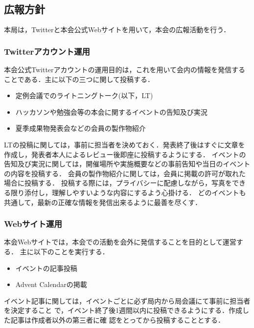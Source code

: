 \subsection*{広報方針}

本局は，Twitterと本会公式Webサイトを用いて，本会の広報活動を行う．

\subsubsection*{Twitterアカウント運用}
本会公式Twitterアカウントの運用目的は，これを用いて会内の情報を発信することである．主に以下の三つに関して投稿する．
\begin{itemize}
    \item 定例会議でのライトニングトーク(以下，LT)
    \item ハッカソンや勉強会等の本会に関するイベントの告知及び実況
    \item 夏季成果物発表会などの会員の製作物紹介
\end{itemize}

LTの投稿に関しては，事前に担当者を決めておく．発表終了後はすぐに文章を作成し，発表者本人によるレビュー後即座に投稿するようにする．
イベントの告知及び実況に関しては，開催場所や実施概要などの事前告知や当日のイベントの内容を投稿する．
会員の製作物紹介に関しては，会員に掲載の許可が取れた場合に投稿する．
投稿する際には，プライバシーに配慮しながら，写真をできる限り添付し，理解しやすいような内容にするよう心掛ける．
どのイベントも共通して，最新の正確な情報を発信出来るように最善を尽くす．

\subsubsection*{Webサイト運用}
本会Webサイトでは，本会での活動を会外に発信することを目的として運営する．
主に以下のことを実行する．
\begin{itemize}
    \item イベントの記事投稿
    \item Advent Calendarの掲載
\end{itemize}

イベント記事に関しては，イベントごとに必ず局内から局会議にて事前に担当者を決定すること
で，イベント終了後1週間以内に投稿できるようにする．作成した記事は作成者以外の第三者に確
認をとってから投稿することとする．